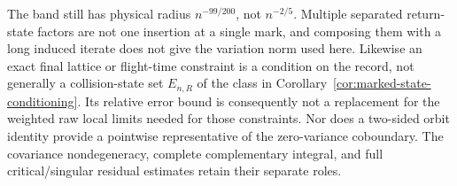 The band still has physical radius $n^{-99/200}$, not $n^{-2/5}$.
Multiple separated return-state factors are not one insertion at a
single mark, and composing them with a long induced iterate does not
give the variation norm used here. Likewise an exact final lattice or
flight-time constraint is a condition on the record, not generally a
collision-state set $E_{n,R}$ of the class in
Corollary~\ref{cor:marked-state-conditioning}. Its relative error bound
is consequently not a replacement for the weighted raw local limits
needed for those constraints. Nor does a two-sided orbit identity
provide a pointwise representative of the zero-variance coboundary.
The covariance nondegeneracy, complete complementary integral, and
full critical/singular residual estimates retain their separate roles.
